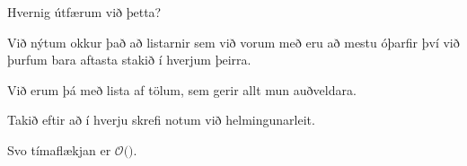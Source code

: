 {
	\only<all:1>{\lisAA}
	\only<all:2>{\lisAB}
	\only<all:3>{\lisAC}
	\only<all:4>{\lisAD}
	\only<all:5>{\lisAE}
	\only<all:6>{\lisAF}
	\only<all:7>{\lisAG}
	\only<all:8>{\lisAH}
	\only<all:9>{\lisAI}
	\only<all:10>{\lisAJ}
	\only<all:11>{\lisAK}
	\only<all:12>{\lisAL}
	\only<all:13>{\lisAM}
	\only<all:14>{\lisAN}
	\only<all:15>{\lisAO}
	\only<all:16>{\lisAP}
	\only<all:17>{\lisAQ}
	\only<all:18>{\lisAR}
	\only<all:19>{\lisAS}
	\only<all:20>{\lisAT}
	\only<all:21>{\lisAU}
	\only<all:22>{\lisAV}
	\only<all:23>{\lisAW}
	\only<all:24>{\lisAX}
	\only<all:25>{\lisAY}
	\only<all:26>{\lisAZ}
	\only<all:27>{\lisBA}
	\only<all:28>{\lisBB}
	\only<all:29>{\lisBC}
	\only<all:30>{\lisBD}
	\only<all:31>{\lisBE}
	\only<all:32>{\lisBF}
	\only<all:33>{\lisBG}
	\only<all:34>{\lisBH}
	\only<all:35>{\lisBI}
	\only<all:36>{\lisBJ}
	\only<all:37>{\lisBK}
	\only<all:38>{\lisBL}
	\only<all:39>{\lisBM}
	\only<all:40>{\lisBN}
	\only<all:41>{\lisBO}
	\only<all:42>{\lisBP}
	\only<all:43>{\lisBQ}
	\only<all:44>{\lisBR}
	\only<all:45>{\lisBS}
	\only<all:46>{\lisBT}
	\only<all:47>{\lisBU}
	\only<all:48>{\lisBV}
	\only<all:49>{\lisBW}
	\only<all:50>{\lisBX}
	\only<all:51>{\lisBY}
	\only<all:52>{\lisBZ}
	\only<all:53>{\lisCA}
	\only<all:54>{\lisCB}
	\only<all:55>{\lisCC}
	\only<all:56>{\lisCD}
	\only<all:57>{\lisCE}
	\only<all:58>{\lisCF}
	\only<all:59>{\lisCG}
	\only<all:60>{\lisCH}
	\only<all:61>{\lisCI}
	\only<all:62>{\lisCJ}
	\only<all:63>{\lisCK}
	\only<all:64>{\lisCL}
	\only<all:65>{\lisCM}
	\only<all:66>{\lisCN}
	\only<all:67>{\lisCO}
	\only<all:68>{\lisCP}
	\only<all:69>{\lisCQ}
	\only<all:70>{\lisCR}
	\only<all:71>{\lisCS}
	\only<all:72>{\lisCT}
	\only<all:73>{\lisCU}
	\only<all:74>{\lisCV}
}

{
	{
		\item<1-> Hvernig útfærum við þetta?
		\item<2-> Við nýtum okkur það að listarnir sem við vorum með eru að mestu óþarfir því við þurfum bara aftasta stakið í hverjum þeirra.
		\item<3-> Við erum þá með lista af tölum, sem gerir allt mun auðveldara.
	}
}

{
}

{
	{
		\item<1-> Takið eftir að í hverju skrefi notum við helmingunarleit.
		\item<2-> Svo tímaflækjan er $\mathcal{O}($\onslide<3->{$n \log n$}$)$.
	}
}


